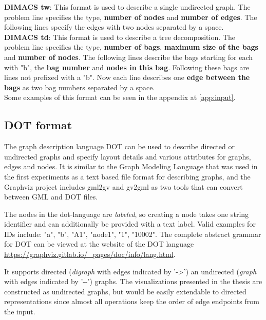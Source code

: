 \documentclass[a4paper, 12pt, bibliography=totoc]{scrartcl}
\begin{document}
\textbf{DIMACS tw}: This format is used to describe a single undirected graph. The problem line specifies the type, \textbf{number of nodes} and \textbf{number of edges}. The following lines specify the edges with two nodes separated by a space.\\

\textbf{DIMACS td}: This format is used to describe a tree decomposition. The problem line specifies the type, \textbf{number of bags}, \textbf{maximum size of the bags} and \textbf{number of nodes}. The following lines describe the bags starting for each with "b", the \textbf{bag number} and \textbf{nodes in this bag}. Following these bags are lines not prefixed with a "b". Now each line describes one \textbf{edge between the bags} as two bag numbers separated by a space.\\


Some examples of this format can be seen in the appendix at \ref{app:input}.

\subsection{DOT format}
The graph description language DOT can be used to describe directed or undirected graphs and specify layout details and various attributes for graphs, edges and nodes. It is similar to the Graph Modeling Language that was used in the first experiments as a text based file format for describing graphs, and the Graphviz project includes gml2gv and gv2gml as two tools that can convert between GML and DOT files.



The nodes in the dot-language are \emph{labeled}, so creating a node takes one string identifier and can additionally be provided with a text label. Valid examples for IDs include: "a", "b", "A1", "node1", "1", "10002".
The complete abstract grammar for DOT can be viewed at the website of the DOT language \url{https://graphviz.gitlab.io/_pages/doc/info/lang.html}.

It supports directed (\textit{digraph} with edges indicated by '->') an undirected (\textit{graph} with edges indicated by '-{}-') graphs.
The visualizations presented in the thesis are constructed as undirected graphs, but would be easily extendable to directed representations since almost all operations keep the order of edge endpoints from the input.
\end{document}
